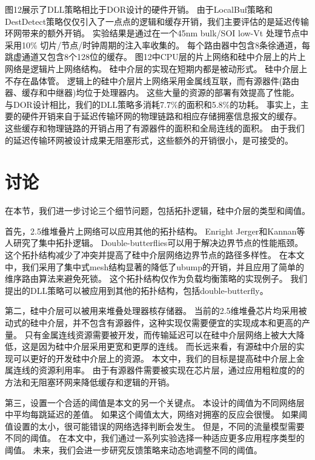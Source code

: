图12展示了DLL策略相比于DOR设计的硬件开销。
由于LocalBuf策略和DestDetect策略仅仅引入了一点点的逻辑和缓存开销，我们主要评估的是延迟传输环网带来的额外开销。
实验结果是通过在一个45nm bulk/SOI low-Vt 处理节点中采用10\% 切片/节点/时钟周期的注入率收集的。
每个路由器中包含8条徐通道，每跳虚通道又包含8个128位的缓存。
图12中CPU层的片上网络和硅中介层上的片上网络是逻辑片上网络结构。
硅中介层的实现在短期内都是被动形式。
硅中介层上不存在晶体管。
逻辑上的硅中介层片上网络采用金属线互联，而有源器件(路由器、缓存和中继器)均位于处理器内。
这些大量的资源的部署有效提高了性能。
与DOR设计相比，我们的DLL策略多消耗7.7\%的面积和5.8\%的功耗。
事实上，主要的硬件开销来自于延迟传输环网的物理链路和相应存储拥塞信息报文的缓存。
这些缓存和物理链路的开销占用了有源器件的面积和全局连线的面积。
由于我们的延迟传输环网被设计成果无阻塞形式，这些额外的开销很小，是可接受的。


\section{讨论}

在本节，我们进一步讨论三个细节问题，包括拓扑逻辑，硅中介层的类型和阈值。

首先，2.5维堆叠片上网络可以应用其他的拓扑结构。
Enright Jerger和Kannan等人研究了集中拓扑逻辑。
Double-butterflies可以用于解决边界节点的性能瓶颈。
这个拓扑结构减少了冲突并提高了硅中介层网络边界节点的路径多样性。
在本文中，我们采用了集中式mesh结构显著的降低了ubump的开销，并且应用了简单的维序路由算法来避免死锁。
这个拓扑结构仅作为负载均衡策略的实现例子。
我们提出的DLL策略可以被应用到其他的拓扑结构，包括double-butterfly。

第二，硅中介层可以被用来堆叠处理器核存储器。
当前的2.5维堆叠芯片均采用被动式的硅中介层，并不包含有源器件，这种实现仅需要便宜的实现成本和更高的产量。
只有金属连线资源需要被开发，而传输延迟可以在硅中介层网络上被大大降低，这是因为硅中介层采用更宽和更厚的连线。
而长远来看，有源硅中介层的实现可以更好的开发硅中介层上的资源。
本文中，我们的目标是提高硅中介层上金属连线的资源利用率。
由于有源器件需要被实现在芯片层，通过应用粗粒度的的方法和无阻塞环网来降低缓存和逻辑的开销。

第三，设置一个合适的阈值是本文的另一个关键点。
本设计的阈值为不同网络层中平均每跳延迟的差值。
如果这个阈值太大，网络对拥塞的反应会很慢。
如果阈值设置的太小，很可能错误的网络选择判断会发生。
但是，不同的流量模型需要不同的阈值。
在本文中，我们通过一系列实验选择一种适应更多应用程序类型的阈值。
未来，我们会进一步研究反馈策略来动态地调整不同的阈值。



